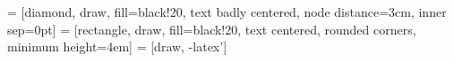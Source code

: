 \usepackage{tikz}
\usetikzlibrary{shapes,arrows}

 = [diamond, draw, fill=black!20, text badly centered, node distance=3cm, inner sep=0pt]
 = [rectangle, draw, fill=black!20, text centered, rounded corners, minimum height=4em]
 = [draw, -latex']
